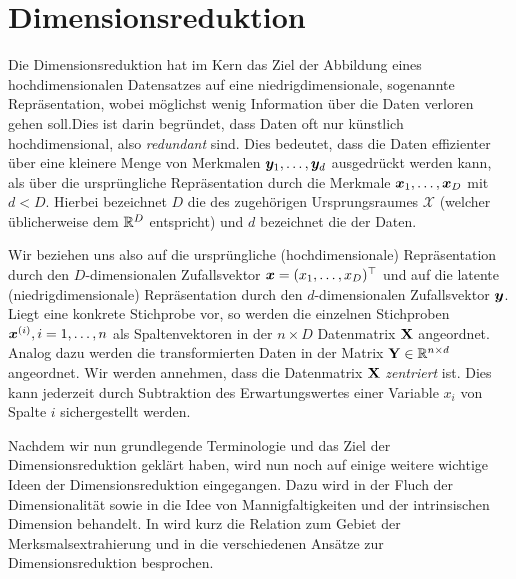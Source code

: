 \chapter{Dimensionsreduktion}
\label{ch:Dimensionsreduktion}

Die Dimensionsreduktion hat im Kern das Ziel der Abbildung eines hochdimensionalen Datensatzes auf
eine niedrigdimensionale, sogenannte  Repräsentation, wobei möglichst wenig
Information über die Daten verloren gehen soll.\addref Dies ist darin begründet, dass Daten oft nur
künstlich hochdimensional, also \textit{redundant} sind. Dies bedeutet, dass die Daten effizienter
über eine kleinere Menge von Merkmalen $\bm{y}_1,\ldots,\bm{y}_d$ ausgedrückt werden kann,
als über die ursprüngliche Repräsentation durch die Merkmale $\bm{x}_1,\ldots,\bm{x}_D$ mit
$d < D$. Hierbei bezeichnet $D$ die  des zugehörigen
Ursprungsraumes $\mathcal{X}$ (welcher üblicherweise dem $\mathbb{R}^D$ entspricht) und $d$ bezeichnet
die  der Daten.

Wir beziehen uns also auf die ursprüngliche (hochdimensionale) Repräsentation durch den
$D$-dimensionalen Zufallsvektor $\bm{x} = (x_1, \ldots, x_D)^\top$ und auf die latente
(niedrigdimensionale) Repräsentation durch den $d$-dimensionalen Zufallsvektor $\bm{y}$. Liegt
eine konkrete Stichprobe vor, so werden die einzelnen Stichproben $\bm{x}^{(i)}, i = 1,\ldots,n$
als Spaltenvektoren in der $n \times D$ Datenmatrix $\mathbf{X}$ angeordnet. Analog dazu werden die
transformierten Daten in der Matrix $\mathbf{Y} \in \mathbb{R}^{n \times d}$ angeordnet. Wir werden
annehmen, dass die Datenmatrix $\mathbf{X}$ \textit{zentriert} ist. Dies kann jederzeit durch
Subtraktion des Erwartungswertes einer Variable $x_i$ von Spalte $i$ sichergestellt werden.

Nachdem wir nun grundlegende Terminologie und das Ziel der Dimensionsreduktion geklärt haben, wird
nun noch auf einige weitere wichtige Ideen der Dimensionsreduktion eingegangen. Dazu wird in
 der Fluch der Dimensionalität sowie in
 die Idee von Mannigfaltigkeiten und
der intrinsischen Dimension behandelt. In  wird
kurz die Relation zum Gebiet der Merksmalsextrahierung und in
 die verschiedenen Ansätze zur Dimensionsreduktion
besprochen.
